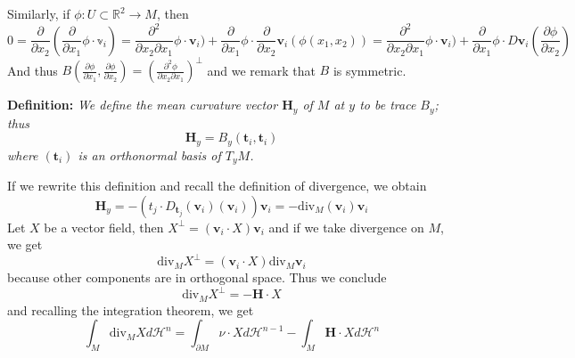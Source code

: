 \vspace{2ex}
Similarly, if $\phi:U\subset\mathbb R^2\rightarrow M$, then
\[0=\frac{\partial}{\partial x_2}(\frac{\partial}{\partial x_1}\phi\cdot\mathbb{v}_i)=
\frac{\partial^2}{\partial x_2\partial x_1}\phi\cdot\mathbf{v}_i)+\frac{\partial}{\partial x_1}\phi\cdot\frac{\partial}{\partial x_2}\mathbf{v}_i(\phi(x_1,x_2))=
\frac{\partial^2}{\partial x_2\partial x_1}\phi\cdot\mathbf{v}_i)+\frac{\partial}{\partial x_1}\phi\cdot D\mathbf{v}_i(\frac{\partial\phi}{\partial x_2})
\]
And thus $B(\frac{\partial\phi}{\partial x_1},\frac{\partial\phi}{\partial x_2})=(\frac{\partial^2\phi}{\partial x_2\partial x_1})^\bot$
and we remark that $B$ is symmetric.

\vspace{2ex}
\textbf{Definition:} \textit{We define the mean curvature vector $\mathbf H_y$
of $M$ at $y$ to be trace $B_y$; thus}
\[\mathbf H_y=B_y(\mathbf t_i,\mathbf t_i)\]
\textit{where $(\mathbf t_i)$ is an orthonormal basis of $T_yM$.}

\vspace{2ex}
If we rewrite this definition and recall the definition of divergence, we obtain
\[\mathbf H_y=-(t_j\cdot D_{\mathbf t_j}(\mathbf v_i)(\mathbf v_i))\mathbf v_i=-\text{div}_M(\mathbf v_i)\mathbf v_i\]
Let $X$ be a vector field, then $X^\bot=(\mathbf v_i\cdot X)\mathbf v_i$ and if we take divergence on $M$, we get
\[\text{div}_M X^\bot=(\mathbf v_i\cdot X)\text{div}_M \mathbf v_i\]
because other components are in orthogonal space. Thus we conclude
\[\text{div}_M X^\bot=-\mathbf H\cdot X\]
and recalling the integration theorem, we get
\[\int_M \text{div}_MXd\mathcal H^n=\int_{\partial M}\nu\cdot Xd\mathcal H^{n-1}-\int_M \mathbf H\cdot Xd\mathcal H^n\]

